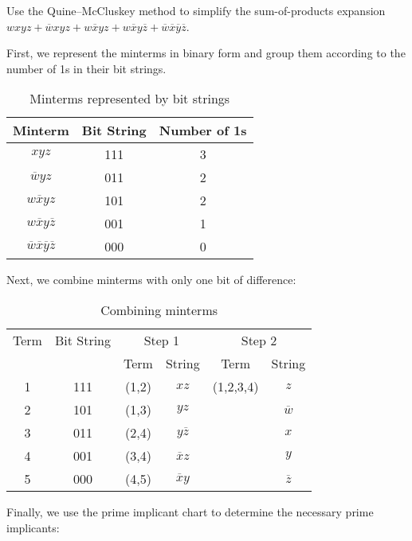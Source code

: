 	\begin{example}
		Use the Quine--McCluskey method to simplify the sum-of-products expansion $wxyz + \overline{w}xyz + w\overline{x}yz + w\overline{x}y\overline{z} + \overline{w}\overline{x}\overline{y}\overline{z}$.
		\begin{solution}
		First, we represent the minterms in binary form and group them according to the number of 1s in their bit strings.
		
		\begin{table}[H]
			\centering
			\caption{Minterms represented by bit strings}
			\begin{tabular}{@{}ccc@{}}
				\toprule
				Minterm & Bit String & Number of 1s \\
				\midrule
				\( xyz \) & 111 & 3 \\
				\( \overline{w}yz \) & 011 & 2 \\
				\( w\overline{x}yz \) & 101 & 2 \\
				\( w\overline{x}y\overline{z} \) & 001 & 1 \\
				\( \overline{w}\overline{x}\overline{y}\overline{z} \) & 000 & 0 \\
				\bottomrule
			\end{tabular}
		\end{table}
		
		Next, we combine minterms with only one bit of difference:
		
		\begin{table}[H]
			\centering
			\caption{ Combining minterms}
			\begin{tabular}{@{}cccccc@{}}
				\toprule
				Term & Bit String & \multicolumn{2}{c}{Step 1} & \multicolumn{2}{c}{Step 2} \\
				\cmidrule(r){3-4} \cmidrule(l){5-6}
				& & Term & String & Term & String \\
				\midrule
				1 & 111 & (1,2) & \( xz \) & (1,2,3,4) & \( z \) \\
				2 & 101 & (1,3) & \( yz \) & & \( \overline{w} \) \\
				3 & 011 & (2,4) & \( y\overline{z} \) & & \( x \) \\
				4 & 001 & (3,4) & \( \overline{x}z \) & & \( y \) \\
				5 & 000 & (4,5) & \( \overline{x}y \) & & \( \overline{z} \) \\
				\bottomrule
			\end{tabular}
		\end{table}
		
		Finally, we use the prime implicant chart to determine the necessary prime implicants:
		

\end{solution}
\end{example}
